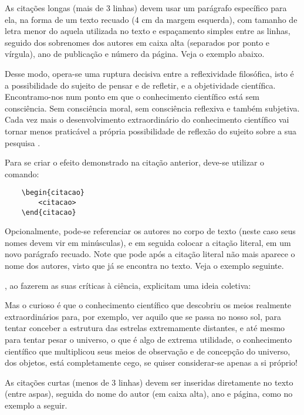 As citações longas (mais de 3 linhas) devem usar um parágrafo específico para ela, na forma de um texto recuado (4 cm da margem esquerda), com tamanho de letra menor do aquela utilizada no texto e espaçamento simples entre as linhas, seguido dos sobrenomes dos autores em caixa alta (separados por ponto e vírgula), ano de publicação e número da página.
Veja o exemplo abaixo.

\begin{citacao}
Desse modo, opera-se uma ruptura decisiva entre a reflexividade filosófica, isto    é a possibilidade do sujeito de pensar e de refletir, e a objetividade científica.
Encontramo-nos num ponto em que o conhecimento científico está sem consciência.
Sem consciência moral, sem consciência reflexiva e também subjetiva.
Cada vez mais o desenvolvimento extraordinário do conhecimento científico vai tornar menos praticável a própria possibilidade de reflexão do sujeito sobre a sua pesquisa \cite[p.~28]{morinmoigne:2000}.
\end{citacao}

Para se criar o efeito demonstrado na citação anterior, deve-se utilizar o comando:
\begin{verbatim}
    \begin{citacao}
        <citacao>
    \end{citacao}
\end{verbatim}

Opcionalmente, pode-se referenciar os autores no corpo de texto (neste caso seus nomes devem vir em minúsculas), e em seguida colocar a citação literal, em um novo parágrafo recuado.
Note que pode após a citação literal não mais aparece o nome dos autores, visto que já se encontra no texto.
Veja o exemplo seguinte.

, ao fazerem as suas críticas à ciência, explicitam uma ideia coletiva:

\begin{citacao}
Mas o curioso é que o conhecimento científico que descobriu os meios realmente extraordinários para, por exemplo, ver aquilo que se passa no nosso sol, para tentar conceber a estrutura das estrelas extremamente distantes, e até mesmo para tentar pesar o universo, o que é algo de extrema utilidade, o conhecimento científico que multiplicou seus meios de observação e de concepção do universo, dos objetos, está completamente cego, se quiser considerar-se apenas a si próprio!
\end{citacao}

As citações curtas (menos de 3 linhas) devem ser inseridas diretamente no texto (entre aspas), seguida do nome do autor (em caixa alta), ano e página, como no exemplo a seguir.

